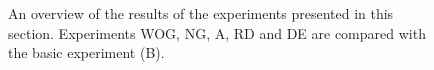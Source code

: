 \begin{figure}
\caption{An overview of the results of the experiments presented in this section. Experiments WOG, NG, A, RD and DE are compared with the basic experiment (B).}
\label{f:par:int}
\end{figure}

